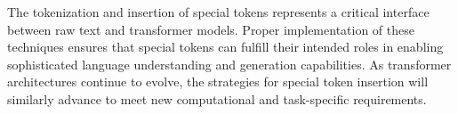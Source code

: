 The tokenization and insertion of special tokens represents a critical interface between raw text and transformer models. Proper implementation of these techniques ensures that special tokens can fulfill their intended roles in enabling sophisticated language understanding and generation capabilities. As transformer architectures continue to evolve, the strategies for special token insertion will similarly advance to meet new computational and task-specific requirements.
